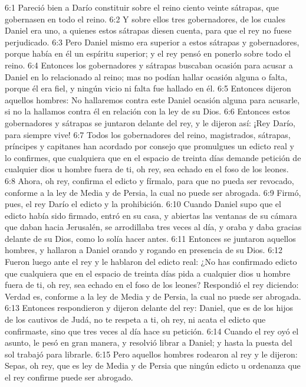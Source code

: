 6:1 Pareció bien a Darío constituir sobre el reino ciento veinte sátrapas, que gobernasen en todo el reino. 
6:2 Y sobre ellos tres gobernadores, de los cuales Daniel era uno, a quienes estos sátrapas diesen cuenta, para que el rey no fuese perjudicado. 
6:3 Pero Daniel mismo era superior a estos sátrapas y gobernadores, porque había en él un espíritu superior; y el rey pensó en ponerlo sobre todo el reino. 
6:4 Entonces los gobernadores y sátrapas buscaban ocasión para acusar a Daniel en lo relacionado al reino; mas no podían hallar ocasión alguna o falta, porque él era fiel, y ningún vicio ni falta fue hallado en él. 
6:5 Entonces dijeron aquellos hombres: No hallaremos contra este Daniel ocasión alguna para acusarle, si no la hallamos contra él en relación con la ley de su Dios. 
6:6 Entonces estos gobernadores y sátrapas se juntaron delante del rey, y le dijeron así: ¡Rey Darío, para siempre vive! 
6:7 Todos los gobernadores del reino, magistrados, sátrapas, príncipes y capitanes han acordado por consejo que promulgues un edicto real y lo confirmes, que cualquiera que en el espacio de treinta días demande petición de cualquier dios u hombre fuera de ti, oh rey, sea echado en el foso de los leones. 
6:8 Ahora, oh rey, confirma el edicto y fírmalo, para que no pueda ser revocado, conforme a la ley de Media y de Persia, la cual no puede ser abrogada. 
6:9 Firmó, pues, el rey Darío el edicto y la prohibición. 
6:10 Cuando Daniel supo que el edicto había sido firmado, entró en su casa, y abiertas las ventanas de su cámara que daban hacia Jerusalén, se arrodillaba tres veces al día, y oraba y daba gracias delante de su Dios, como lo solía hacer antes. 
6:11 Entonces se juntaron aquellos hombres, y hallaron a Daniel orando y rogando en presencia de su Dios. 
6:12 Fueron luego ante el rey y le hablaron del edicto real: ¿No has confirmado edicto que cualquiera que en el espacio de treinta días pida a cualquier dios u hombre fuera de ti, oh rey, sea echado en el foso de los leones? Respondió el rey diciendo: Verdad es, conforme a la ley de Media y de Persia, la cual no puede ser abrogada. 
6:13 Entonces respondieron y dijeron delante del rey: Daniel, que es de los hijos de los cautivos de Judá, no te respeta a ti, oh rey, ni acata el edicto que confirmaste, sino que tres veces al día hace su petición. 
6:14 Cuando el rey oyó el asunto, le pesó en gran manera, y resolvió librar a Daniel; y hasta la puesta del sol trabajó para librarle. 
6:15 Pero aquellos hombres rodearon al rey y le dijeron: Sepas, oh rey, que es ley de Media y de Persia que ningún edicto u ordenanza que el rey confirme puede ser abrogado. 
